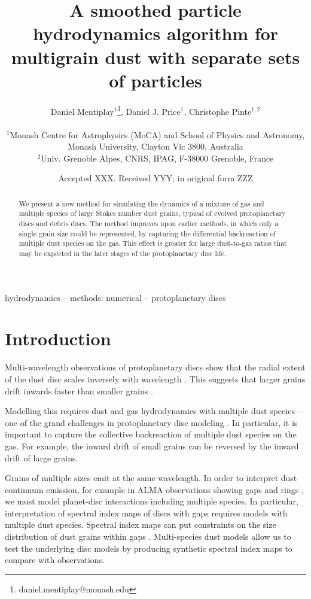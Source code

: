 \documentclass[fleqn,usenatbib]{mnras}
\title[SPH for multigrain dust]{A smoothed particle hydrodynamics algorithm for
multigrain dust with separate sets of particles}
\author[Mentiplay, Price, \& Pinte]{%
   \parbox{\textwidth}{%
      Daniel Mentiplay\(^{1}\)\thanks{daniel.mentiplay@monash.edu},
      Daniel J. Price\(^{1}\),
      Christophe Pinte\(^{1,2}\)
   }\\
   \(^{1}\)Monash Centre for Astrophysics (MoCA) and School of Physics and
   Astronomy, Monash University, Clayton Vic 3800, Australia \\
   \(^{2}\)Univ. Grenoble Alpes, CNRS, IPAG, F-38000 Grenoble, France
}
\date{Accepted XXX. Received YYY; in original form ZZZ}
\begin{document}
\label{firstpage}
\pagerange{\pageref{firstpage}--\pageref{lastpage}}
\maketitle

\begin{abstract}
   We present a new method for simulating the dynamics of a mixture of gas and
   multiple species of large Stokes number dust grains, typical of evolved
   protoplanetary discs and debris discs. The method improves upon earlier
   methods, in which only a single grain size could be represented, by capturing
   the differential backreaction of multiple dust species on the gas. This
   effect is greater for large dust-to-gas ratios that may be expected in the
   later stages of the protoplanetary disc life.
\end{abstract}

\begin{keywords}
hydrodynamics -- methods: numerical -- protoplanetary discs
\end{keywords}



\section{Introduction}

Multi-wavelength observations of protoplanetary discs show that the radial
extent of the dust disc scales inversely with wavelength
\citep{Andrews2015PASP..127..961A}. This suggests that larger grains drift
inwards faster than smaller grains \citep{Weidenschilling1977MNRAS.180...57W}.

Modelling this requires dust and gas hydrodynamics with multiple dust
species---one of the grand challenges in protoplanetary disc modeling
\citep{Haworth2016PASA...33...53H}. In particular, it is important to capture
the collective backreaction of multiple dust species on the gas. For example,
the inward drift of small grains can be reversed by the inward drift of large
grains.

Grains of multiple sizes emit at the same wavelength. In order to interpret dust
continuum emission, for example in ALMA observations showing gaps and rings
\citep{ALMAPartnership2015ApJ...808L...3A, Andrews2016ApJ...820L..40A}, we must
model planet-disc interactions including multiple species. In particular,
interpretation of spectral index maps of discs with gaps requires models with
multiple dust species. Spectral index maps can put constraints on the size
distribution of dust grains within gaps \citep{Huang2018ApJ...852..122H}.
Multi-species dust models allow us to test the underlying disc models by
producing synthetic spectral index maps to compare with observations.
\end{document}
